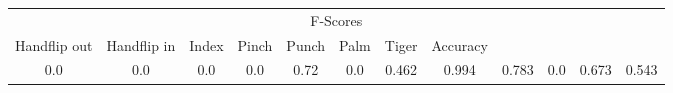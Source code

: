\documentclass{standalone}
\begin{document}
 
 \begin{tabular}{|c|c|c|c|c|c|c|c|c|c|c ||c|}
\cline{1-12}\multicolumn{12}{|c|}{F-Scores} \\ 
\cline{1-12}Handflip out & Handflip in & Index & Pinch & Punch & Palm & Tiger & Accuracy\\ 
\cline{1-12}0.0 & 0.0 & 0.0 & 0.0 & 0.72 & 0.0 & 0.462 & 0.994 & 0.783 & 0.0 & 0.673 & 0.543\\ 
 \cline{1-12}\hline \end{tabular}
 
\end{document}
